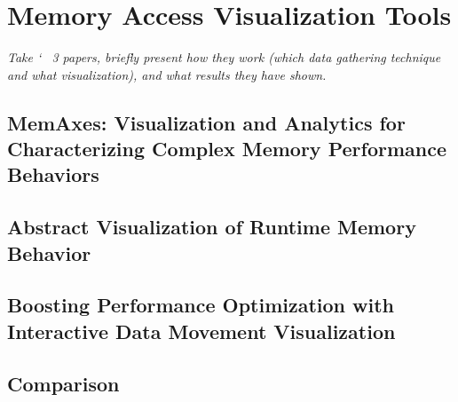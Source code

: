 \section{Memory Access Visualization Tools}\label{sec:works}
\textit{Take \char`~ 3 papers, briefly present how they work (which data gathering technique and what visualization), and what results they have shown.}

\subsection{MemAxes: Visualization and Analytics for
Characterizing Complex Memory Performance
Behaviors}\label{sec:memaxes}
\cite{gimenez2017memaxes}

\subsection{Abstract Visualization of
Runtime Memory Behavior}\label{sec:abstract}
\cite{choudhury2011abstract}

\subsection{Boosting Performance Optimization with Interactive
Data Movement Visualization}\label{sec:boosting}
\cite{schaad2022boosting}

\subsection{Comparison}\label{sec:comparison}